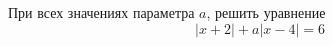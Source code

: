 \begin{ex}
	\begin{condition}
		При всех значениях параметра \( a \), решить уравнение
		\[ |x+2|+a|x-4|=6 \]
	\end{condition}
\end{ex}